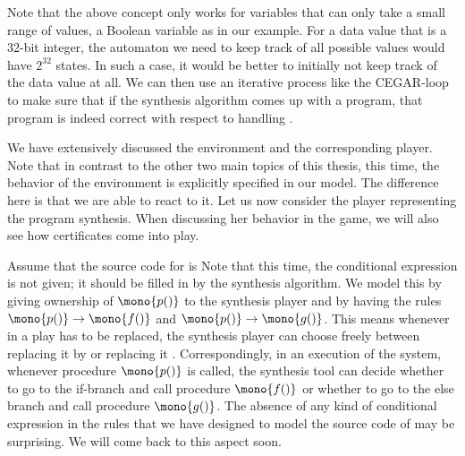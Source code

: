 \documentclass[../../diss.tex]{subfiles}
\begin{document}
Note that the above concept only works for variables that can only take a small range of values, \eg a Boolean variable as in our example.
For a data value that is \eg a 32-bit integer, the automaton we need to keep track of all possible values would have $2^{32}$ states.
In such a case, it would be better to initially not keep track of the data value at all.
We can then use an iterative process like the CEGAR-loop~\cite{ClarkeGJLV00,HeizmannHP10} to make sure that if the synthesis algorithm comes up with a program, that program is indeed correct with respect to handling .

We have extensively discussed the environment and the corresponding player.
Note that in contrast to the other two main topics of this thesis, this time, the behavior of the environment is explicitly specified in our model.
The difference here is that we are able to react to it.
Let us now consider the player representing the program synthesis.
When discussing her behavior in the game, we will also see how certificates come into play.

Assume that the source code for  is 
Note that this time, the conditional expression is not given; it should be filled in by the synthesis algorithm.
We model this by giving ownership of $\mono{p()}$ to the synthesis player and by having the rules $\mono{p()} \to \mono{f()}$ and $\mono{p()} \to \mono{g()}$.
This means whenever in a play  has to be replaced, the synthesis player can choose freely between replacing it by  or replacing it .
Correspondingly, in an execution of the system, whenever procedure $\mono{p()}$ is called, the synthesis tool can decide whether to go to the if-branch and call procedure $\mono{f()}$ or whether to go to the else branch and call procedure $\mono{g()}$.
The absence of any kind of conditional expression in the rules that we have designed to model the source code of  may be surprising.
We will come back to this aspect soon.
\end{document}
